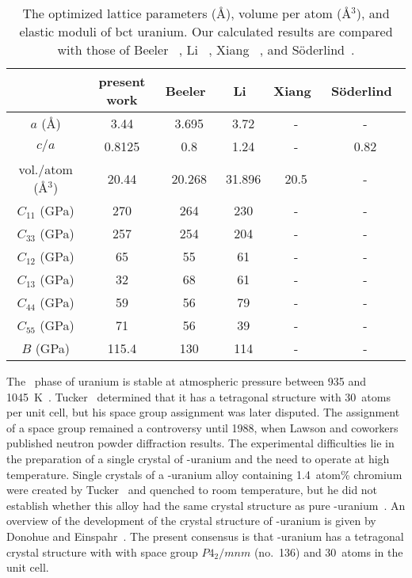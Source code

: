 \begin{table}
\caption[The optimized lattice parameters (\AA), volume per atom (\AA$^3$) and elastic moduli of bct uranium.]{The optimized lattice parameters (\AA), volume per atom (\AA$^3$), and elastic moduli of bct uranium. Our calculated results are compared with those of Beeler \etal~\cite{beeler2013first}, Li \etal~\cite{li2012structure},
Xiang \etal~\cite{xiang2008quantum}, and S\"oderlind~\cite{Soderlind1998}.}
\label{table:eq_bct}
\begin{tabular}{cccccc}
  \toprule
		& present work & Beeler~\cite{beeler2013first} & Li~\cite{li2012structure} & Xiang~\cite{xiang2008quantum} & S\"oderlind~\cite{Soderlind1998} \\ \midrule
$a$ (\AA)		&   3.44	   & 3.695	& 3.72 & - & -\\
$c/a$	&	0.8125	   & 0.8	& 1.24 & - & 0.82 \\
vol./atom (\AA$^3$)& 20.44	   & 20.268 & 31.896 & 20.5 & - \\
$C_{11}$ (GPa) &  270		   & 264	& 230 & - & -	\\
$C_{33}$ (GPa) &  257		   & 254	& 204 & - & -	\\
$C_{12}$ (GPa) &  65		   & 55		& 61 & - & -	\\
$C_{13}$ (GPa) &	32		   & 68		& 61 & - & -	\\
$C_{44}$ (GPa) &	59		   & 56		& 79 & - & -	\\
$C_{55}$ (GPa) &	71		   & 56		& 39 & - & - \\
$B$ (GPa)    &	115.4	   & 130	& 114  & - & - \\
  \bottomrule
\end{tabular}
\end{table}
The \textbeta~phase of uranium is stable at atmospheric pressure between 935
and 1045~K~\cite{lawson1988structure}.
Tucker~\cite{tucker1950approximate} determined that it has a tetragonal
structure with 30~atoms per unit cell, but his space group assignment was
later disputed. The assignment of a space group remained a controversy until
1988, when Lawson and coworkers~\cite{lawson1988structure} published neutron
powder diffraction results.
The experimental difficulties lie in the preparation of a single crystal of
\textbeta-uranium and the need to operate at high temperature.
Single crystals of a \textbeta-uranium alloy containing 1.4~atom\% chromium
were created by Tucker~\cite{tucker1951crystal} and quenched to room
temperature, but he did not establish whether this alloy had the same crystal
structure as pure \textbeta-uranium~\cite{lawson1988structure}. An overview of
the development of the crystal structure of \textbeta-uranium is given by
Donohue and Einspahr~\cite{donohue1971structure, donohue1974structures}. The
present consensus is that \textbeta-uranium has a tetragonal crystal structure
with with space group $P4_2/mnm$ (no.~136) and 30~atoms in the unit cell.

